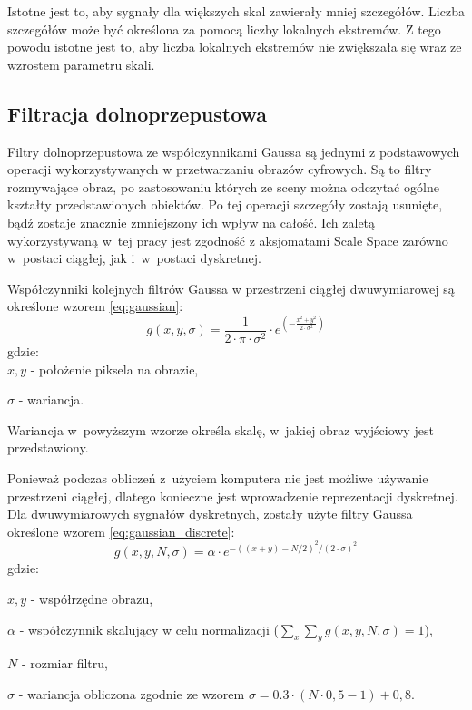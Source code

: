 Istotne jest to, aby sygnały dla większych skal zawierały mniej szczegółów. Liczba szczegółów może być określona za pomocą liczby lokalnych ekstremów. Z tego powodu istotne jest to, aby liczba lokalnych ekstremów nie zwiększała się wraz ze wzrostem parametru skali.

\subsection{Filtracja dolnoprzepustowa}
\label{subsec:filtracjaGaussa}
Filtry dolnoprzepustowa ze współczynnikami Gaussa są jednymi z podstawowych operacji wykorzystywanych w przetwarzaniu obrazów cyfrowych. Są to filtry rozmywające obraz, po zastosowaniu których ze sceny można odczytać ogólne kształty przedstawionych obiektów. Po tej operacji szczegóły zostają usunięte, bądź zostaje znacznie zmniejszony ich wpływ na całość. Ich zaletą wykorzystywaną w~tej pracy jest zgodność z aksjomatami Scale Space zarówno w~postaci ciągłej, jak i~w~postaci dyskretnej.

Współczynniki kolejnych filtrów Gaussa w przestrzeni ciągłej dwuwymiarowej są określone wzorem \eqref{eq:gaussian}:
\begin{equation}
\label{eq:gaussian}
g(x,y,\sigma)=\frac{1}{2 \cdot \pi \cdot \sigma^ {2} }\cdot e^{(-\frac{x^{2} + y^{2}}{2 \cdot \sigma ^{2}})}
\end{equation}
gdzie:\\

$ x,y $ - położenie piksela na obrazie,

$ \sigma $ - wariancja.

Wariancja w~powyższym wzorze określa skalę, w~jakiej obraz wyjściowy jest przedstawiony. 

Ponieważ podczas obliczeń z~użyciem komputera nie jest możliwe używanie przestrzeni ciągłej, dlatego konieczne jest wprowadzenie reprezentacji dyskretnej. 
Dla dwuwymiarowych sygnałów dyskretnych, zostały użyte filtry Gaussa określone wzorem \eqref{eq:gaussian_discrete}:
\begin{equation}
\label{eq:gaussian_discrete}
g(x,y,N,\sigma) = \alpha \cdot e^{-((x+y)-N/2)^2/(2 \cdot \sigma)^2}
\end{equation}
gdzie:

$ x, y$ - współrzędne obrazu,

$ \alpha $ - współczynnik skalujący w celu normalizacji ($ \sum_x \sum_y g(x,y,N,\sigma) = 1 $),

$ N $ - rozmiar filtru,

$ \sigma $ - wariancja obliczona zgodnie ze wzorem $ \sigma = 0.3 \cdot (N \cdot 0,5 - 1) + 0,8$.

